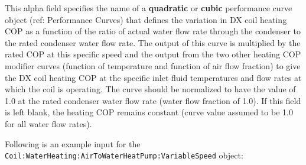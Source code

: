This alpha field specifies the name of a \textbf{quadratic} or \textbf{cubic} performance curve object (ref: Performance Curves) that defines the variation in DX coil heating COP as a function of the ratio of actual water flow rate through the condenser to the rated condenser water flow rate.
The output of this curve is multiplied by the rated COP at this specific speed and the output from the two other heating COP modifier curves (function of temperature and function of air flow fraction) to give the DX coil heating COP at the specific inlet fluid temperatures and flow rates at which the coil is operating. The curve should be normalized to have the value of 1.0 at the rated condenser water flow rate (water flow fraction of 1.0). If this field is left blank, the heating COP remains constant (curve value assumed to be 1.0 for all water flow rates).

Following is an example input for the \lstinline!Coil:WaterHeating:AirToWaterHeatPump:VariableSpeed! object:

